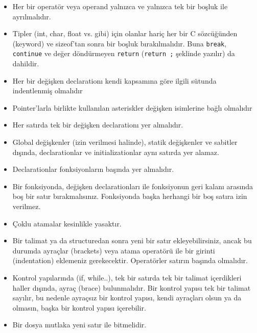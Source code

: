 \documentclass{42-en}
\begin{document}
\begin{itemize}
                \item Her bir operatör veya operand yalnızca ve yalnızca tek bir boşluk ile ayrılmalıdır.

                \item Tipler (int, char, float vs. gibi) için olanlar hariç her bir C sözcüğünden (keyword) ve sizeof’tan sonra bir
boşluk bırakılmalıdır. Buna \texttt{break}, \texttt{continue} ve değer döndürmeyen
\texttt{return} (\texttt{return ;} şeklinde yazılır) da dahildir.

                \item Her bir değişken declarationı kendi kapsamına göre ilgili sütunda indentlenmiş olmalıdır

                \item Pointer’larla birlikte kullanılan asteriskler değişken isimlerine bağlı olmalıdır

                \item Her satırda tek bir değişken declarationı yer almalıdır.

                \item Global değişkenler (izin verilmesi halinde), statik değişkenler ve sabitler dışında, declarationlar ve initializationlar aynı satırda yer alamaz.

                \item Declarationlar fonksiyonların başında yer almalıdır.

                \item Bir fonksiyonda, değişken declarationları ile fonksiyonun geri kalanı arasında boş bir satır bırakmalısınız.
Fonksiyonda başka herhangi bir boş satıra izin verilmez.

                \item Çoklu atamalar kesinlikle yasaktır.

                \item Bir talimat ya da structuredan sonra yeni bir satır ekleyebilirsiniz, ancak bu durumda ayraçlar (brackets)
veya atama operatörü ile bir girinti (indentation) eklemeniz gerekecektir. Operatörler satırın başında olmalıdır.

                \item Kontrol yapılarında (if, while..), tek bir satırda tek bir talimat içerdikleri haller
dışında, ayraç (brace) bulunmalıdır. Bir kontrol yapısı tek bir talimat sayılır, bu nedenle
ayraçsız bir kontrol yapısı, kendi ayraçları olsun ya da olmasın, başka bir kontrol yapısı
içerebilir.

            \item Bir dosya mutlaka yeni satır ile bitmelidir.

            \end{itemize}
\end{document}
